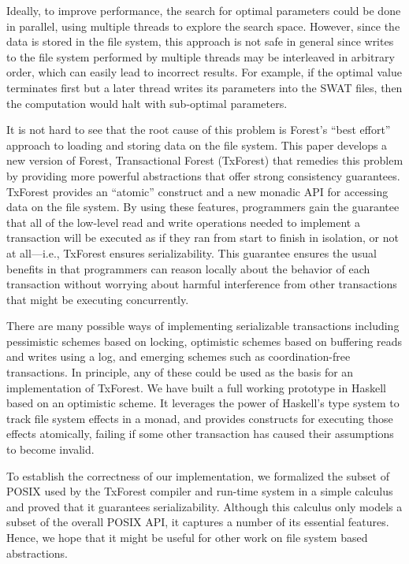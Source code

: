 %
%
Ideally, to improve performance, the search for optimal parameters
could be done in parallel, using multiple threads to explore the
search space. However, since the data is stored in the file system,
this approach is not safe in general since writes to the file system
performed by multiple threads may be interleaved in arbitrary order,
which can easily lead to incorrect results. For example, if the
optimal value terminates first but a later thread writes its
parameters into the SWAT files, then the computation would halt with
sub-optimal parameters.

%
%
It is not hard to see that the root cause of this problem is Forest's
``best effort'' approach to loading and storing data on the file
system. This paper develops a new version of Forest, Transactional
Forest (TxForest) that remedies this problem by providing more
powerful abstractions that offer strong consistency
guarantees. TxForest provides an ``atomic'' construct and a new
monadic API for accessing data on the file system. By using these
features, programmers gain the guarantee that all of the low-level
read and write operations needed to implement a transaction will be
executed as if they ran from start to finish in isolation, or not at
all---i.e., TxForest ensures serializability. This guarantee ensures
the usual benefits in that programmers can reason locally about the
behavior of each transaction without worrying about harmful
interference from other transactions that might be executing
concurrently.

%
%
There are many possible ways of implementing serializable transactions
including pessimistic schemes based on locking, optimistic schemes
based on buffering reads and writes using a log, and emerging schemes
such as coordination-free transactions. In principle, any of these
could be used as the basis for an implementation of TxForest. We have
built a full working prototype in Haskell based on an optimistic
scheme. It leverages the power of Haskell's type system to track file
system effects in a monad, and provides constructs for executing those
effects atomically, failing if some other transaction has caused their
assumptions to become invalid.

%
%
To establish the correctness of our implementation, we formalized the
subset of POSIX used by the TxForest compiler and run-time system in a
simple calculus and proved that it guarantees serializability.
Although this calculus only models a subset of the overall POSIX API,
it captures a number of its essential features. Hence, we hope that it
might be useful for other work on file system based abstractions.

